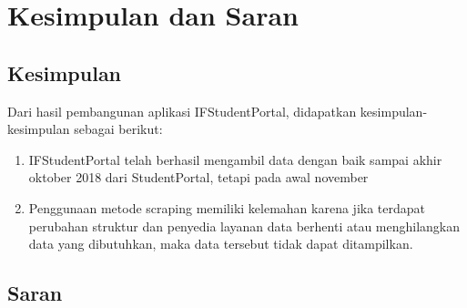 \chapter{Kesimpulan dan Saran}
\label{chap:kesimpulan_saran}

\section{Kesimpulan}
\label{sec:kesimpulan}
Dari hasil pembangunan aplikasi IFStudentPortal, didapatkan kesimpulan-kesimpulan sebagai berikut:
\begin{enumerate}
	\item IFStudentPortal telah berhasil mengambil data dengan baik sampai akhir oktober 2018 dari StudentPortal, tetapi pada awal november
	\item Penggunaan metode scraping memiliki kelemahan karena jika terdapat perubahan struktur dan penyedia layanan data berhenti atau menghilangkan data yang dibutuhkan, maka data tersebut tidak dapat ditampilkan.  
\end{enumerate}

\section{Saran}
\label{sec:saran}